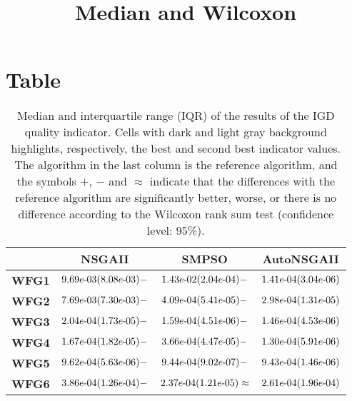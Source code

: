 \documentclass{article}
\title{Median and Wilcoxon}
\author{}
\begin{document}
\maketitle
\section{Table}
\begin{table}[!htp]
  \caption{Median and interquartile range (IQR) of the results of the IGD quality indicator. Cells with dark and light gray background highlights, respectively, the best and second best indicator values. The algorithm in the last column is the reference algorithm, and the symbols $+$, $-$ and $\approx$ indicate that the differences with the reference algorithm are significantly better, worse, or there is no difference according to the Wilcoxon rank sum test (confidence level: 95\%).}
  \label{table:IGD}
  \centering
  \begin{tiny}
  \begin{tabular}{c|ccc}
      & \textbf{NSGAII} & \textbf{SMPSO} & \textbf{AutoNSGAII} \\\hline
\textbf{WFG1} & $\cellcolor{gray25} {9.69e\makebox[0.1cm]{-}03(8.08e\makebox[0.1cm]{-}03)-} $ & $ {1.43e\makebox[0.1cm]{-}02(2.04e\makebox[0.1cm]{-}04)-} $ & $ \cellcolor{gray95} 1.41e\makebox[0.1cm]{-}04(3.04e\makebox[0.1cm]{-}06)$ \\
\textbf{WFG2} & ${7.69e\makebox[0.1cm]{-}03(7.30e\makebox[0.1cm]{-}03)-} $ & $ \cellcolor{gray25} {4.09e\makebox[0.1cm]{-}04(5.41e\makebox[0.1cm]{-}05)-} $ & $ \cellcolor{gray95} 2.98e\makebox[0.1cm]{-}04(1.31e\makebox[0.1cm]{-}05)$ \\
\textbf{WFG3} & ${2.04e\makebox[0.1cm]{-}04(1.73e\makebox[0.1cm]{-}05)-} $ & $ \cellcolor{gray25} {1.59e\makebox[0.1cm]{-}04(4.51e\makebox[0.1cm]{-}06)-} $ & $ \cellcolor{gray95} 1.46e\makebox[0.1cm]{-}04(4.53e\makebox[0.1cm]{-}06)$ \\
\textbf{WFG4} & $\cellcolor{gray25} {1.67e\makebox[0.1cm]{-}04(1.82e\makebox[0.1cm]{-}05)-} $ & $ {3.66e\makebox[0.1cm]{-}04(4.47e\makebox[0.1cm]{-}05)-} $ & $ \cellcolor{gray95} 1.30e\makebox[0.1cm]{-}04(5.91e\makebox[0.1cm]{-}06)$ \\
\textbf{WFG5} & ${9.62e\makebox[0.1cm]{-}04(5.63e\makebox[0.1cm]{-}06)-} $ & $ \cellcolor{gray25} {9.44e\makebox[0.1cm]{-}04(9.02e\makebox[0.1cm]{-}07)-} $ & $ \cellcolor{gray95} 9.43e\makebox[0.1cm]{-}04(1.46e\makebox[0.1cm]{-}06)$ \\
\textbf{WFG6} & ${3.86e\makebox[0.1cm]{-}04(1.26e\makebox[0.1cm]{-}04)-} $ & $ \cellcolor{gray95} {2.37e\makebox[0.1cm]{-}04(1.21e\makebox[0.1cm]{-}05)\approx} $ & $ \cellcolor{gray25} 2.61e\makebox[0.1cm]{-}04(1.96e\makebox[0.1cm]{-}04)$ \\

\end{tabular}
\end{tiny}
\end{table}
\end{document}
